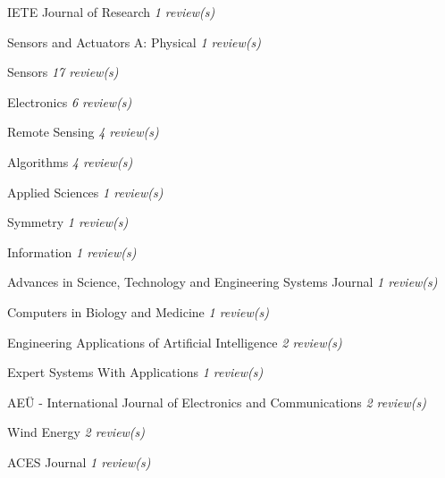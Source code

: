 {\begin{cvitems}
    \item {IETE Journal of Research \hfill \bodyfontlight\slshape\color{awesome} 1 review(s)}
    \item {Sensors and Actuators A: Physical \hfill \bodyfontlight\slshape\color{awesome} 1 review(s)}
    \item {Sensors \hfill \bodyfontlight\slshape\color{awesome} 17 review(s)}
    \item {Electronics \hfill \bodyfontlight\slshape\color{awesome} 6 review(s)}
    \item {Remote Sensing \hfill \bodyfontlight\slshape\color{awesome} 4 review(s)}
    \item {Algorithms \hfill \bodyfontlight\slshape\color{awesome} 4 review(s)}
    \item {Applied Sciences \hfill \bodyfontlight\slshape\color{awesome} 1 review(s)}
    \item {Symmetry \hfill \bodyfontlight\slshape\color{awesome} 1 review(s)}
    \item {Information \hfill \bodyfontlight\slshape\color{awesome} 1 review(s)}
    \item {Advances in Science, Technology and Engineering Systems Journal \hfill \bodyfontlight\slshape\color{awesome} 1 review(s)}
    \item {Computers in Biology and Medicine \hfill \bodyfontlight\slshape\color{awesome} 1 review(s)}
    \item {Engineering Applications of Artificial Intelligence \hfill \bodyfontlight\slshape\color{awesome} 2 review(s)}
    \item {Expert Systems With Applications \hfill \bodyfontlight\slshape\color{awesome} 1 review(s)}
    \item {AEÜ - International Journal of Electronics and Communications \hfill \bodyfontlight\slshape\color{awesome} 2 review(s)}
    \item {Wind Energy \hfill \bodyfontlight\slshape\color{awesome} 2 review(s)}
    \item {ACES Journal \hfill \bodyfontlight\slshape\color{awesome} 1 review(s)}
    
    \vspace{4.0mm}
\end{cvitems}
}


